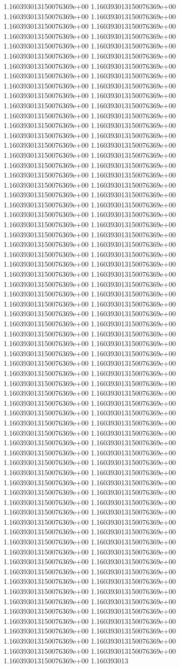 1.160393013150076369e+00	1.160393013150076369e+00	1.160393013150076369e+00	1.160393013150076369e+00	1.160393013150076369e+00	1.160393013150076369e+00	1.160393013150076369e+00	1.160393013150076369e+00	1.160393013150076369e+00	1.160393013150076369e+00	1.160393013150076369e+00	1.160393013150076369e+00	1.160393013150076369e+00	1.160393013150076369e+00	1.160393013150076369e+00	1.160393013150076369e+00	1.160393013150076369e+00	1.160393013150076369e+00	1.160393013150076369e+00	1.160393013150076369e+00	1.160393013150076369e+00	1.160393013150076369e+00	1.160393013150076369e+00	1.160393013150076369e+00	1.160393013150076369e+00	1.160393013150076369e+00	1.160393013150076369e+00	1.160393013150076369e+00	1.160393013150076369e+00	1.160393013150076369e+00	1.160393013150076369e+00	1.160393013150076369e+00	1.160393013150076369e+00	1.160393013150076369e+00	1.160393013150076369e+00	1.160393013150076369e+00	1.160393013150076369e+00	1.160393013150076369e+00	1.160393013150076369e+00	1.160393013150076369e+00	1.160393013150076369e+00	1.160393013150076369e+00	1.160393013150076369e+00	1.160393013150076369e+00	1.160393013150076369e+00	1.160393013150076369e+00	1.160393013150076369e+00	1.160393013150076369e+00	1.160393013150076369e+00	1.160393013150076369e+00	1.160393013150076369e+00	1.160393013150076369e+00	1.160393013150076369e+00	1.160393013150076369e+00	1.160393013150076369e+00	1.160393013150076369e+00	1.160393013150076369e+00	1.160393013150076369e+00	1.160393013150076369e+00	1.160393013150076369e+00	1.160393013150076369e+00	1.160393013150076369e+00	1.160393013150076369e+00	1.160393013150076369e+00	1.160393013150076369e+00	1.160393013150076369e+00	1.160393013150076369e+00	1.160393013150076369e+00	1.160393013150076369e+00	1.160393013150076369e+00	1.160393013150076369e+00	1.160393013150076369e+00	1.160393013150076369e+00	1.160393013150076369e+00	1.160393013150076369e+00	1.160393013150076369e+00	1.160393013150076369e+00	1.160393013150076369e+00	1.160393013150076369e+00	1.160393013150076369e+00	1.160393013150076369e+00	1.160393013150076369e+00	1.160393013150076369e+00	1.160393013150076369e+00	1.160393013150076369e+00	1.160393013150076369e+00	1.160393013150076369e+00	1.160393013150076369e+00	1.160393013150076369e+00	1.160393013150076369e+00	1.160393013150076369e+00	1.160393013150076369e+00	1.160393013150076369e+00	1.160393013150076369e+00	1.160393013150076369e+00	1.160393013150076369e+00	1.160393013150076369e+00	1.160393013150076369e+00	1.160393013150076369e+00	1.160393013150076369e+00	1.160393013150076369e+00	1.160393013150076369e+00	1.160393013150076369e+00	1.160393013150076369e+00	1.160393013150076369e+00	1.160393013150076369e+00	1.160393013150076369e+00	1.160393013150076369e+00	1.160393013150076369e+00	1.160393013150076369e+00	1.160393013150076369e+00	1.160393013150076369e+00	1.160393013150076369e+00	1.160393013150076369e+00	1.160393013150076369e+00	1.160393013150076369e+00	1.160393013150076369e+00	1.160393013150076369e+00	1.160393013150076369e+00	1.160393013150076369e+00	1.160393013150076369e+00	1.160393013150076369e+00	1.160393013150076369e+00	1.160393013150076369e+00	1.160393013150076369e+00	1.160393013150076369e+00	1.160393013150076369e+00	1.160393013150076369e+00	1.160393013150076369e+00	1.160393013150076369e+00	1.160393013150076369e+00	1.160393013150076369e+00	1.160393013150076369e+00	1.160393013